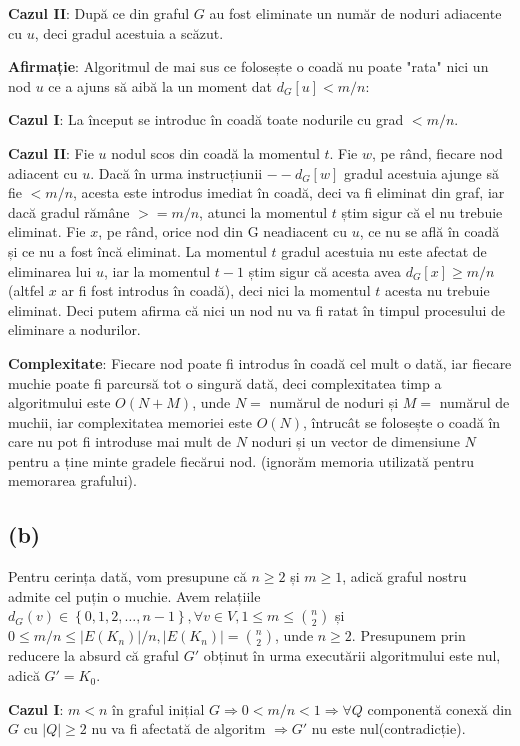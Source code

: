 \documentclass[a4paper,12pt]{article}
\begin{document}
\textbf{Cazul II}: După ce din graful $G$ au fost eliminate un număr de noduri adiacente cu $u$, deci gradul acestuia a scăzut. 

\textbf{Afirmație}: Algoritmul de mai sus ce folosește o coadă nu poate "rata" nici un nod $u$ ce a ajuns să aibă la un moment dat $d_G[u] < m/n$:

\textbf{Cazul I}: La început se introduc în coadă toate nodurile cu grad $ < m/n $.

\textbf{Cazul II}: Fie $u$ nodul scos din coadă la momentul $t$. Fie $w$, pe rând, fiecare nod adiacent cu $u$. Dacă în urma instrucțiunii $--d_G[w]$ gradul acestuia ajunge să fie $ < m/n $, acesta este introdus imediat în coadă, deci va fi eliminat din graf, iar dacă gradul rămâne $ >= m/n $, atunci la momentul $t$ știm sigur că el nu trebuie eliminat. Fie $x$, pe rând, orice nod din G neadiacent cu $u$, ce nu se află în coadă și ce nu a fost încă eliminat. La momentul $t$ gradul acestuia nu este afectat de eliminarea lui $u$, iar la momentul $t-1$ știm sigur că acesta avea $d_G[x] \geq m/n$ (altfel $x$ ar fi fost introdus în coadă), deci nici la momentul $t$ acesta nu trebuie eliminat. Deci putem afirma că nici un nod nu va fi ratat în timpul procesului de eliminare a nodurilor.

\textbf{Complexitate}: Fiecare nod poate fi introdus în coadă cel mult o dată, iar fiecare muchie poate fi parcursă tot o singură dată, deci complexitatea timp a algoritmului este $O(N+M)$, unde $N=$ numărul de noduri și $M=$ numărul de muchii, iar complexitatea memoriei este $O(N)$, întrucât se folosește o coadă în care nu pot fi introduse mai mult de $N$ noduri și un vector de dimensiune $N$ pentru a ține minte gradele fiecărui nod. (ignorăm memoria utilizată pentru memorarea grafului). 

\subsection{(b)}

Pentru cerința dată, vom presupune că $n \geq 2$ și $m \geq 1$, adică graful nostru admite cel puțin o muchie. Avem relațiile $d_G(v) \in \left\{0,1,2,\ldots,n-1\right\}, \forall v \in V, 1 \leq m \leq \binom{n}{2}$ și $0 \leq m/n \leq |E(K_n)|/n, |E(K_n)|=\binom{n}{2}$, unde $n \geq 2$.\newline
Presupunem prin reducere la absurd că graful $G'$ obținut în urma executării algoritmului este nul, adică $G' = K_0$.

\textbf{Cazul I}: $m < n$ în graful inițial $G \Rightarrow 0 < m/n <1 \Rightarrow \forall Q$ componentă conexă din $G$ cu $|Q| \geq 2$ nu va fi afectată de algoritm $\Rightarrow G'$ nu este nul(contradicție).
\end{document}
